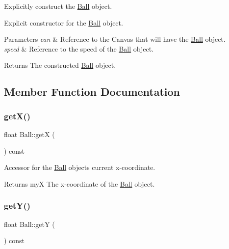 Explicitly construct the \hyperlink{class_ball}{Ball} object. 

Explicit constructor for the \hyperlink{class_ball}{Ball} object. 
\begin{DoxyParams}{Parameters}
{\em can} & Reference to the Canvas that will have the \hyperlink{class_ball}{Ball} object. \\
\hline
{\em speed} & Reference to the speed of the \hyperlink{class_ball}{Ball} object. \\
\hline
\end{DoxyParams}
\begin{DoxyReturn}{Returns}
The constructed \hyperlink{class_ball}{Ball} object. 
\end{DoxyReturn}


\subsection{Member Function Documentation}
\mbox{\label{class_ball_af438c37fd83fcf0f5808712d9b456320}} 
\subsubsection{\texorpdfstring{get\+X()}{getX()}}
{\footnotesize\ttfamily float Ball\+::getX (\begin{DoxyParamCaption}{ }\end{DoxyParamCaption}) const}



Accessor for the \hyperlink{class_ball}{Ball} object\textquotesingle{}s current x-\/coordinate. 

\begin{DoxyReturn}{Returns}
myX The x-\/coordinate of the \hyperlink{class_ball}{Ball} object. 
\end{DoxyReturn}
\mbox{\label{class_ball_aeb4e2979fb20b91c9e23c1ee6b2897ae}} 
\subsubsection{\texorpdfstring{get\+Y()}{getY()}}
{\footnotesize\ttfamily float Ball\+::getY (\begin{DoxyParamCaption}{ }\end{DoxyParamCaption}) const}



